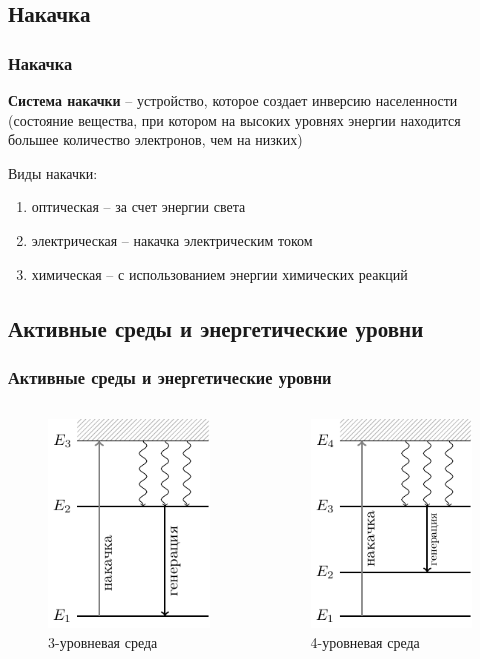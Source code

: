 \documentclass[10pt,pdf,hyperref={unicode}, dvipsnames]{beamer}
\newcommand\frametitless[1]{\subsection{#1}\frametitle{#1}}
\begin{document}
\begin{frame}[t]
	\frametitless{Накачка}
	\textbf{Система накачки} -- устройство, которое создает инверсию населенности (состояние вещества, при  котором на высоких уровнях энергии находится большее количество электронов, чем на низких)


	Виды накачки: 
	\begin{enumerate}
		\item оптическая – за счет энергии света
		\item электрическая – накачка электрическим током
		\item химическая – с использованием энергии химических реакций
	\end{enumerate}
\end{frame}
\begin{frame}[t]
	\frametitless{Активные среды и энергетические уровни}

	\begin{columns}
		\begin{column}{0.49\textwidth}
			\begin{figure}[h]
				\centering
				\includegraphics[]{images/3nd}
				\caption{3-уровневая среда}
			\end{figure}	
		\end{column}
		\begin{column}{0.49\textwidth}
			\begin{figure}[h]
				\centering
				\includegraphics[]{images/4nd}
				\caption{4-уровневая среда}
			\end{figure}	
		\end{column}
	\end{columns}


\end{frame}
\end{document}
